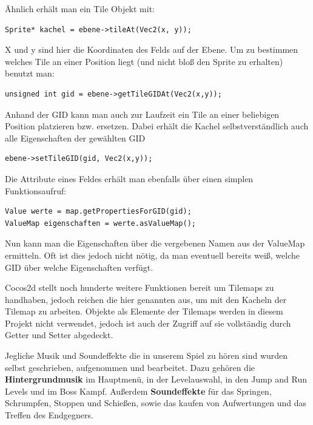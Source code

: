 Ähnlich erhält man ein Tile Objekt mit:

\begin{lstlisting}[style=singleline]
Sprite* kachel = ebene->tileAt(Vec2(x, y));
\end{lstlisting}

X und y sind hier die Koordinaten des Felds auf der Ebene.
Um zu bestimmen welches Tile an einer Position liegt (und nicht bloß den Sprite zu erhalten) benutzt man:

\begin{lstlisting}[style=singleline]
unsigned int gid = ebene->getTileGIDAt(Vec2(x,y));
\end{lstlisting}

Anhand der GID kann man auch zur Laufzeit ein Tile an einer beliebigen Position platzieren bzw. ersetzen. Dabei erhält die Kachel selbstverständlich auch alle Eigenschaften der gewählten GID	

\begin{lstlisting}[style=singleline]
ebene->setTileGID(gid, Vec2(x,y));
\end{lstlisting}

Die Attribute eines Feldes erhält man ebenfalls über einen simplen Funktionsaufruf:

\begin{lstlisting}[style=singleline]
Value werte = map.getPropertiesForGID(gid);
ValueMap eigenschaften = werte.asValueMap();
\end{lstlisting}

Nun kann man die Eigenschaften über die vergebenen Namen aus der ValueMap ermitteln. Oft ist dies jedoch nicht nötig, da man eventuell bereits weiß, welche GID über welche Eigenschaften verfügt.

Cocos2d stellt noch hunderte weitere Funktionen bereit um Tilemaps zu handhaben, jedoch reichen die hier genannten aus, um mit den Kacheln der Tilemap zu arbeiten. Objekte als Elemente der Tilemaps werden in diesem Projekt nicht verwendet, jedoch ist auch der Zugriff auf sie vollständig durch Getter und Setter abgedeckt.



\label{sec:2_Musik}
Jegliche Musik und Soundeffekte die in unserem Spiel \gamename zu hören sind wurden selbst geschrieben, aufgenommen und bearbeitet. Dazu gehören die
\textbf{Hintergrundmusik} im Hauptmenü, in der Levelauswahl, in den Jump and Run Levels und im Boss Kampf. Außerdem \textbf{Soundeffekte} für das Springen, Schrumpfen, Stoppen und Schießen, sowie das kaufen von Aufwertungen und das Treffen des Endgegners.



